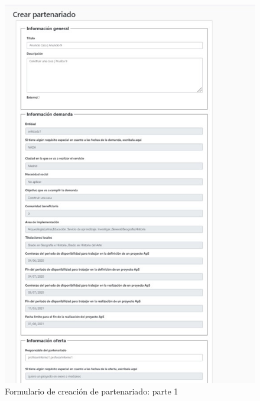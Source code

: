 \documentclass[11pt]{book}
\begin{document}
\begin{figure}[t]
	\centering
	\includegraphics[scale=0.9]{partenariado1}
	\caption{Formulario de creación de partenariado: parte 1}
\end{figure}
\end{document}
